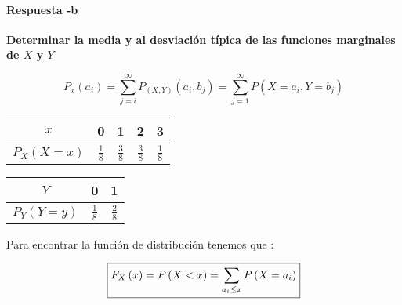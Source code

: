 \documentclass[12pt]{article}
\begin{document}
    \paragraph*{Respuesta -b } {\bf Determinar la media y al desviaci\'on t\'ipica de las funciones marginales  de $X$ y  $Y$ }

    \begin{equation*}
        P_x \left(a_i\right) = \sum_{j=i}^{\infty} P_{\left(X,Y\right)}\left(a_i,b_j\right) = \sum_{j=1}^{\infty} P \left(X =a_i , Y = b_j\right)
    \end{equation*}

    
    \begin{table*}[h]
        \begin{center}
            \renewcommand{\arraystretch}{1.5}
            \begin{tabular}{|c|c|c|c|c|}
                \hline
                $x$ & 0 & 1 & 2 & 3
                \\
                \hline 
                $P_X\left(X=x\right)$ & $\frac{1}{8}$ & $\frac{3}{8}$ & $\frac{3}{8}$ & $\frac{1}{8}$
                \\
                \hline
            \end{tabular}
        \end{center}
    \end{table*}
    
    \begin{table*}[h]
        \begin{center}
            \renewcommand{\arraystretch}{1.5}
            \begin{tabular}{|c|c|c|}
                \hline
                $Y$ & 0 & 1 
                \\
                \hline 
                $P_Y\left(Y=y\right)$ & $\frac{1}{8}$ & $\frac{2}{8}$
                \\
                \hline
            \end{tabular}
        \end{center}
    \end{table*}
   

    \begin{flushleft}
        Para encontrar la funci\'on de distribuci\'on tenemos que : 
    \end{flushleft}



    \begin{equation*}
        \fbox{$\displaystyle
        F_X\left(x\right) = P \left(X <x\right) =  \sum_{a_i\le x} P \left(X = a_i\right)
        $}
    \end{equation*}
\end{document}
